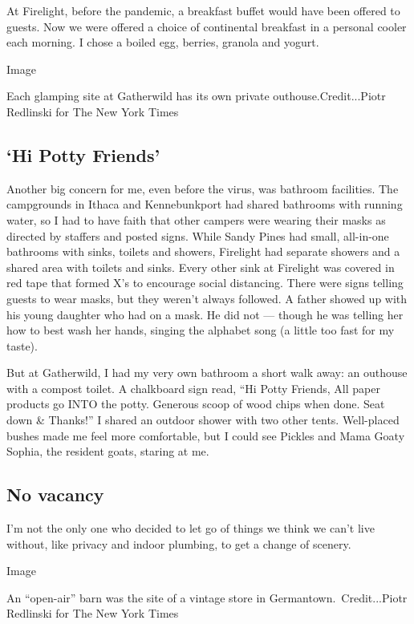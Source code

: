 At Firelight, before the pandemic, a breakfast buffet would have been
offered to guests. Now we were offered a choice of continental breakfast
in a personal cooler each morning. I chose a boiled egg, berries,
granola and yogurt.

Image

Each glamping site at Gatherwild has its own private
outhouse.Credit...Piotr Redlinski for The New York Times

\hypertarget{hi-potty-friends}{%
\subsection{`Hi Potty Friends'}\label{hi-potty-friends}}

Another big concern for me, even before the virus, was bathroom
facilities. The campgrounds in Ithaca and Kennebunkport had shared
bathrooms with running water, so I had to have faith that other campers
were wearing their masks as directed by staffers and posted signs. While
Sandy Pines had small, all-in-one bathrooms with sinks, toilets and
showers, Firelight had separate showers and a shared area with toilets
and sinks. Every other sink at Firelight was covered in red tape that
formed X's to encourage social distancing. There were signs telling
guests to wear masks, but they weren't always followed. A father showed
up with his young daughter who had on a mask. He did not --- though he
was telling her how to best wash her hands, singing the alphabet song (a
little too fast for my taste).

But at Gatherwild, I had my very own bathroom a short walk away: an
outhouse with a compost toilet. A chalkboard sign read, ``Hi Potty
Friends, All paper products go INTO the potty. Generous scoop of wood
chips when done. Seat down \& Thanks!'' I shared an outdoor shower with
two other tents. Well-placed bushes made me feel more comfortable, but I
could see Pickles and Mama Goaty Sophia, the resident goats, staring at
me.

\hypertarget{no-vacancy}{%
\subsection{No vacancy}\label{no-vacancy}}

I'm not the only one who decided to let go of things we think we can't
live without, like privacy and indoor plumbing, to get a change of
scenery.

Image

An ``open-air'' barn was the site of a vintage store in
Germantown.~Credit...Piotr Redlinski for The New York Times

